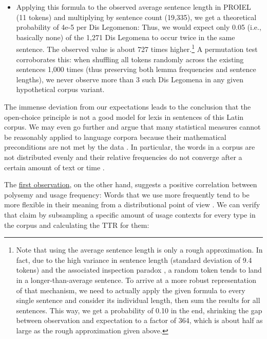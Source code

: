 \begin{itemize}
	$\frac{sentence\_length * (sentence\_length - 1)}{token\_count * (token\_count - 1)}$
    \item Applying this formula to the observed average sentence length in PROIEL (11 tokens) and multiplying by sentence count (19,335), we get a theoretical probability of 4e-5 per Dis Legomenon: Thus, we would expect only 0.05 (i.e., basically none) of the 1,271 Dis Legomena to occur twice in the same sentence. The observed value is about 727 times higher.\footnote{Note that using the average sentence length is only a rough approximation. In fact, due to the high variance in sentence length (standard deviation of 9.4 tokens) and the associated inspection paradox \parencite[2]{palInspectionParadoxStochastic2022}, a random token tends to land in a longer-than-average sentence. To arrive at a more robust representation of that mechanism, we need to actually apply the given formula to every single sentence and consider its individual length, then sum the results for all sentences. This way, we get a probability of 0.10 in the end, shrinking the gap between observation and expectation to a factor of 364, which is about half as large as the rough approximation given above.} A permutation test corroborates this: when shuffling all tokens randomly across the existing sentences 1,000 times (thus preserving both lemma frequencies and sentence lengths), we never observe more than 3 such Dis Legomena in any given hypothetical corpus variant.
\end{itemize}

The immense deviation from our expectations leads to the conclusion that the open-choice principle is not a good model for lexis in sentences of this Latin corpus. We may even go further and argue that many statistical measures cannot be reasonably applied to language corpora because their mathematical preconditions are not met by the data \parencite[110]{shadrovaMeasuringCoselectionalConstraint2020}. In particular, the words in a corpus are not distributed evenly and their relative frequencies do not converge after a certain amount of text or time \parencite[5]{debowskiNaturalLanguagePerigraphic2018}.

\label{highFrequencyhighPolysemy}
The \hyperref[firstObservation]{first observation}, on the other hand, suggests a positive correlation between polysemy and usage frequency: Words that we use more frequently tend to be more flexible in their meaning from a distributional point of view \parencite[576]{crossleyDevelopmentPolysemyFrequency2010}. We can verify that claim by subsampling a specific amount of usage contexts for every type in the corpus and calculating the \gls{TTR} \parencites[229]{kettunenCanTypetokenRatio2014}[1]{hamiltonDiachronicWordEmbeddings2016} for them:

